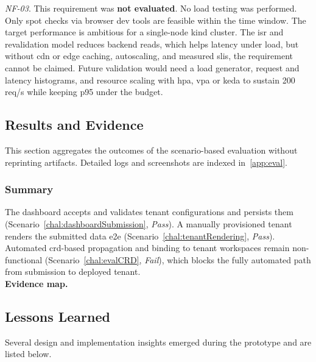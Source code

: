 \documentclass[11pt, a4paper, oneside, listof=totoc]{scrartcl}
\begin{document}
\begin{enumerate}[label={[\arabic*]:},
                    ref=Challenge~\arabic*,
                    leftmargin=*,
                    itemsep=0.6\baselineskip]
                    \item\label{chal:evalNF03}
                        \textit{NF-03}.
                        This requirement was \textbf{not evaluated}.
                        No load testing was performed.
                        Only spot checks via browser dev tools are feasible within the time window.
                        The target performance is ambitious for a single-node \gls{kind} cluster.
                        The \gls{isr} and revalidation model reduces backend reads, which helps
                        latency under load, but without \gls{cdn} or edge caching, autoscaling, and
                        measured \glspl{sli}, the requirement cannot be claimed.
                        Future validation would need a load generator, request and latency
                        histograms, and resource scaling with \gls{hpa}, \gls{vpa} or \gls{keda} to
                        sustain 200 req/s while keeping p95 under the budget.
                \end{enumerate}

        \subsection{Results and Evidence}\label{subsec:evalResultsAndEvidence}
            This section aggregates the outcomes of the scenario-based evaluation without reprinting
            artifacts.
            Detailed logs and screenshots are indexed in~\autoref{app:eval}.\\
            \subsubsection{Summary}\label{subsubsec:evalSummary}
            The dashboard accepts and validates tenant configurations and persists them
            (Scenario~\ref{chal:dashboardSubmission}, \emph{Pass}).
            A manually provisioned tenant renders the submitted data \gls{e2e}
            (Scenario~\ref{chal:tenantRendering}, \emph{Pass}).
            Automated \gls{crd}-based propagation and binding to tenant workspaces remain
            non-functional (Scenario~\ref{chal:evalCRD}, \emph{Fail}),
            which blocks the fully automated path from submission to deployed tenant.\\
            \textbf{Evidence map.}

        \subsection{Lessons Learned}\label{subsec:evalLessonsLearned}
            Several design and implementation insights emerged during the prototype and are listed
            below.
\end{document}
